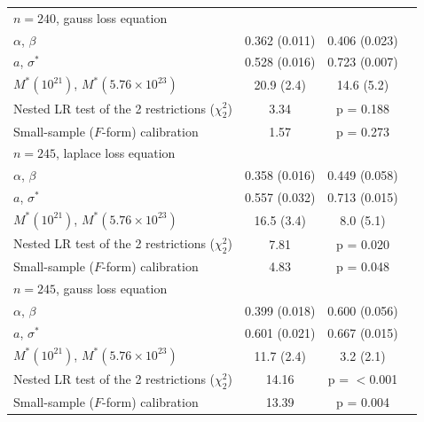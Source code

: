 \begin{table}[!htbp]
\begin{threeparttable}
\begin{tabular}{lccc}
$n=240$, gauss loss equation &  &  &  \\
\quad $\alpha$, $\beta$ & 0.362 (0.011) & 0.406 (0.023) &  \\
\quad $a$, $\sigma^*$ & 0.528 (0.016) & 0.723 (0.007) &  \\
\quad $M^*(10^{21})$, $M^*(5.76\times10^{23})$ & 20.9 (2.4) & 14.6 (5.2) &  \\
\quad Nested LR test of the 2 restrictions ($\chi^2_2$) & 3.34 & p = 0.188 &  \\
\quad Small-sample ($F$-form) calibration & 1.57 & p = 0.273 &  \\
$n=245$, laplace loss equation &  &  &  \\
\quad $\alpha$, $\beta$ & 0.358 (0.016) & 0.449 (0.058) &  \\
\quad $a$, $\sigma^*$ & 0.557 (0.032) & 0.713 (0.015) &  \\
\quad $M^*(10^{21})$, $M^*(5.76\times10^{23})$ & 16.5 (3.4) & 8.0 (5.1) &  \\
\quad Nested LR test of the 2 restrictions ($\chi^2_2$) & 7.81 & p = 0.020 &  \\
\quad Small-sample ($F$-form) calibration & 4.83 & p = 0.048 &  \\
$n=245$, gauss loss equation &  &  &  \\
\quad $\alpha$, $\beta$ & 0.399 (0.018) & 0.600 (0.056) &  \\
\quad $a$, $\sigma^*$ & 0.601 (0.021) & 0.667 (0.015) &  \\
\quad $M^*(10^{21})$, $M^*(5.76\times10^{23})$ & 11.7 (2.4) & 3.2 (2.1) &  \\
\quad Nested LR test of the 2 restrictions ($\chi^2_2$) & 14.16 & p = $<$0.001 &  \\
\quad Small-sample ($F$-form) calibration & 13.39 & p = 0.004 &  \\
\bottomrule
\end{tabular}
\begin{tablenotes}[flushleft]
\footnotesize

\end{tablenotes}
\end{threeparttable}
\end{table}

